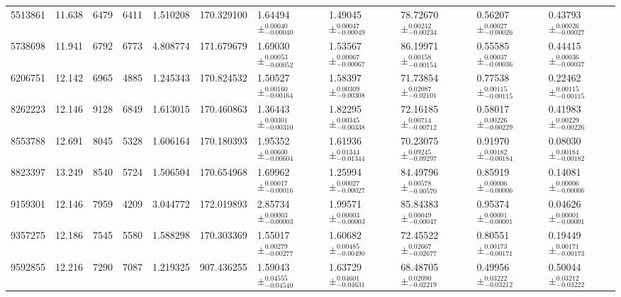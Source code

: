 \begin{sidewaystable*}
\begin{tabular}{rrrrrrlllll}
   5513861 &            11.638 &             6479 &             6411 &  1.510208 &  170.329100 &  1.64494$\pm_{-0.00040}^{0.00040}$ &  1.49045$\pm_{-0.00049}^{0.00047}$ &  78.72670$\pm_{-0.00234}^{0.00242}$ &  0.56207$\pm_{-0.00026}^{0.00027}$ &  0.43793$\pm_{-0.00027}^{0.00026}$ \\
   5738698 &            11.941 &             6792 &             6773 &  4.808774 &  171.679679 &  1.69030$\pm_{-0.00052}^{0.00053}$ &  1.53567$\pm_{-0.00067}^{0.00067}$ &  86.19971$\pm_{-0.00154}^{0.00158}$ &  0.55585$\pm_{-0.00036}^{0.00037}$ &  0.44415$\pm_{-0.00037}^{0.00036}$ \\
   6206751 &            12.142 &             6965 &             4885 &  1.245343 &  170.824532 &  1.50527$\pm_{-0.00164}^{0.00160}$ &  1.58397$\pm_{-0.00308}^{0.00309}$ &  71.73854$\pm_{-0.02101}^{0.02087}$ &  0.77538$\pm_{-0.00115}^{0.00115}$ &  0.22462$\pm_{-0.00115}^{0.00115}$ \\
   8262223 &            12.146 &             9128 &             6849 &  1.613015 &  170.460863 &  1.36443$\pm_{-0.00310}^{0.00301}$ &  1.82295$\pm_{-0.00338}^{0.00345}$ &  72.16185$\pm_{-0.00712}^{0.00714}$ &  0.58017$\pm_{-0.00229}^{0.00226}$ &  0.41983$\pm_{-0.00226}^{0.00229}$ \\
   8553788 &            12.691 &             8045 &             5328 &  1.606164 &  170.180393 &  1.95352$\pm_{-0.00604}^{0.00600}$ &  1.61936$\pm_{-0.01344}^{0.01344}$ &  70.23075$\pm_{-0.09297}^{0.09245}$ &  0.91970$\pm_{-0.00184}^{0.00182}$ &  0.08030$\pm_{-0.00182}^{0.00184}$ \\
   8823397 &            13.249 &             8540 &             5724 &  1.506504 &  170.654968 &  1.69962$\pm_{-0.00016}^{0.00017}$ &  1.25994$\pm_{-0.00027}^{0.00027}$ &  84.49796$\pm_{-0.00570}^{0.00578}$ &  0.85919$\pm_{-0.00006}^{0.00006}$ &  0.14081$\pm_{-0.00006}^{0.00006}$ \\
   9159301 &            12.146 &             7959 &             4209 &  3.044772 &  172.019893 &  2.85734$\pm_{-0.00003}^{0.00003}$ &  1.99571$\pm_{-0.00003}^{0.00003}$ &  85.84383$\pm_{-0.00047}^{0.00049}$ &  0.95374$\pm_{-0.00001}^{0.00001}$ &  0.04626$\pm_{-0.00001}^{0.00001}$ \\
   9357275 &            12.186 &             7545 &             5580 &  1.588298 &  170.303369 &  1.55017$\pm_{-0.00277}^{0.00279}$ &  1.60682$\pm_{-0.00490}^{0.00485}$ &  72.45522$\pm_{-0.02677}^{0.02667}$ &  0.80551$\pm_{-0.00171}^{0.00173}$ &  0.19449$\pm_{-0.00173}^{0.00171}$ \\
   9592855 &            12.216 &             7290 &             7087 &  1.219325 &  907.436255 &  1.59043$\pm_{-0.04540}^{0.04555}$ &  1.63729$\pm_{-0.04631}^{0.04601}$ &  68.48705$\pm_{-0.02219}^{0.02090}$ &  0.49956$\pm_{-0.03212}^{0.03222}$ &  0.50044$\pm_{-0.03222}^{0.03212}$ \\

\end{tabular}
\end{sidewaystable*}
